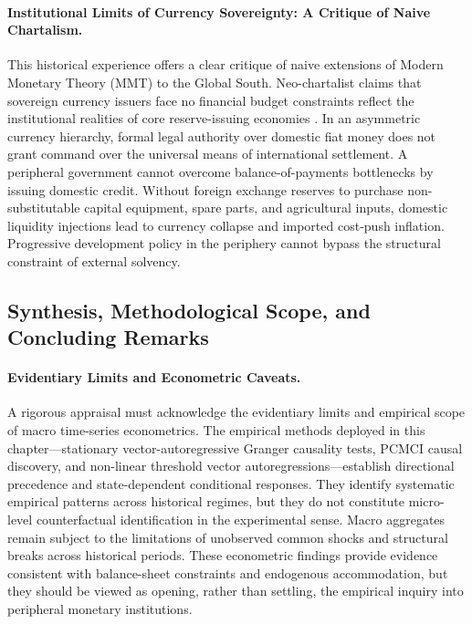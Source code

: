 \paragraph{Institutional Limits of Currency Sovereignty: A Critique of Naive Chartalism.}
This historical experience offers a clear critique of naive extensions of Modern Monetary Theory (MMT) to the Global South. Neo-chartalist claims that sovereign currency issuers face no financial budget constraints reflect the institutional realities of core reserve-issuing economies \citep{AlamiEtAl2022,Vasudevan2009}. In an asymmetric currency hierarchy, formal legal authority over domestic fiat money does not grant command over the universal means of international settlement. A peripheral government cannot overcome balance-of-payments bottlenecks by issuing domestic credit. Without foreign exchange reserves to purchase non-substitutable capital equipment, spare parts, and agricultural inputs, domestic liquidity injections lead to currency collapse and imported cost-push inflation. Progressive development policy in the periphery cannot bypass the structural constraint of external solvency.

\subsection{Synthesis, Methodological Scope, and Concluding Remarks}
\label{sec:synthesis_horizons}

\paragraph{Evidentiary Limits and Econometric Caveats.}
A rigorous appraisal must acknowledge the evidentiary limits and empirical scope of macro time-series econometrics. The empirical methods deployed in this chapter---stationary vector-autoregressive Granger causality tests, PCMCI causal discovery, and non-linear threshold vector autoregressions---establish directional precedence and state-dependent conditional responses. They identify systematic empirical patterns across historical regimes, but they do not constitute micro-level counterfactual identification in the experimental sense. Macro aggregates remain subject to the limitations of unobserved common shocks and structural breaks across historical periods. These econometric findings provide evidence consistent with balance-sheet constraints and endogenous accommodation, but they should be viewed as opening, rather than settling, the empirical inquiry into peripheral monetary institutions.

